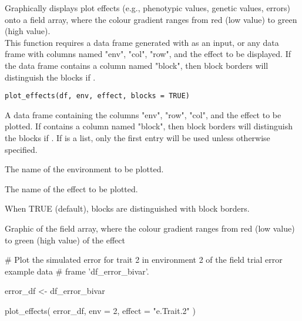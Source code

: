 \documentclass[a4paper]{book}
\begin{document}
%
\begin{Description}\relax
Graphically displays plot effects (e.g., phenotypic values, genetic values, errors) onto
a field array, where the colour gradient ranges from red (low value) to green (high value). \\{}
This function requires a data frame generated with  as an
input, or any data frame with columns named "env", "col", "row", and the effect to be displayed.
If the data frame contains a column named "block", then block borders will distinguish the
blocks if .
\end{Description}
%
\begin{Usage}
\begin{verbatim}
plot_effects(df, env, effect, blocks = TRUE)
\end{verbatim}
\end{Usage}
%
\begin{Arguments}
\begin{ldescription}
\item[\code{df}] A data frame containing the columns "env", "row", "col", and the effect to be plotted.
If  contains a column named "block", then block borders will distinguish the blocks
if . If  is a list, only the first entry will be used unless
otherwise specified.

\item[\code{env}] The name of the environment to be plotted.

\item[\code{effect}] The name of the effect to be plotted.

\item[\code{blocks}] When TRUE (default), blocks are distinguished with block borders.
\end{ldescription}
\end{Arguments}
%
\begin{Value}
Graphic of the field array, where the colour gradient ranges from red (low value) to
green (high value) of the effect
\end{Value}
%
\begin{Examples}
\begin{ExampleCode}
# Plot the simulated error for trait 2 in environment 2 of the field trial error example data
# frame 'df_error_bivar'.

error_df <- df_error_bivar

plot_effects(
  error_df,
  env = 2,
  effect = "e.Trait.2"
)
\end{ExampleCode}
\end{Examples}
\end{document}
